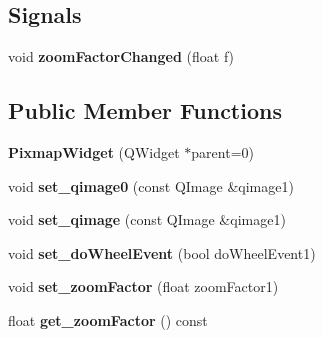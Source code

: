 \subsection*{Signals}
\begin{DoxyCompactItemize}
\item 
\hypertarget{classofeli_1_1_pixmap_widget_ab817a81f26b323d58c0cf659912080d4}{void {\bfseries zoom\-Factor\-Changed} (float f)}\label{classofeli_1_1_pixmap_widget_ab817a81f26b323d58c0cf659912080d4}

\end{DoxyCompactItemize}
\subsection*{Public Member Functions}
\begin{DoxyCompactItemize}
\item 
\hypertarget{classofeli_1_1_pixmap_widget_a51fe3171285939f9fa39cb46afb505e0}{{\bfseries Pixmap\-Widget} (Q\-Widget $\ast$parent=0)}\label{classofeli_1_1_pixmap_widget_a51fe3171285939f9fa39cb46afb505e0}

\item 
\hypertarget{classofeli_1_1_pixmap_widget_a0169b3ce7c469ac8e809275cec1d6cdf}{void {\bfseries set\-\_\-qimage0} (const Q\-Image \&qimage1)}\label{classofeli_1_1_pixmap_widget_a0169b3ce7c469ac8e809275cec1d6cdf}

\item 
\hypertarget{classofeli_1_1_pixmap_widget_a553fb5a31a88e84ddf8490811cd8f6fe}{void {\bfseries set\-\_\-qimage} (const Q\-Image \&qimage1)}\label{classofeli_1_1_pixmap_widget_a553fb5a31a88e84ddf8490811cd8f6fe}

\item 
\hypertarget{classofeli_1_1_pixmap_widget_a16df598b66b7acca419e52172b1f91a7}{void {\bfseries set\-\_\-do\-Wheel\-Event} (bool do\-Wheel\-Event1)}\label{classofeli_1_1_pixmap_widget_a16df598b66b7acca419e52172b1f91a7}

\item 
\hypertarget{classofeli_1_1_pixmap_widget_ab051e68d52dad2be8636a48eab25da06}{void {\bfseries set\-\_\-zoom\-Factor} (float zoom\-Factor1)}\label{classofeli_1_1_pixmap_widget_ab051e68d52dad2be8636a48eab25da06}

\item 
\hypertarget{classofeli_1_1_pixmap_widget_a4484eb00d84068802f22735a8ed76e4c}{float {\bfseries get\-\_\-zoom\-Factor} () const }\label{classofeli_1_1_pixmap_widget_a4484eb00d84068802f22735a8ed76e4c}


\end{DoxyCompactItemize}
